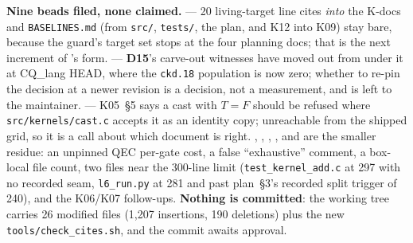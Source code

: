 \textbf{Nine beads filed, none claimed.}  --- 20 living-target line
cites \emph{into} the K-docs and \texttt{BASELINES.md} (from \texttt{src/},
\texttt{tests/}, the plan, and K12 into K09) stay bare, because the guard's
target set stops at the four planning docs; that is the next increment of
's form.  --- \textbf{D15}'s carve-out witnesses have moved
out from under it at CQ\_lang HEAD, where the \texttt{ckd.18} population is now
zero; whether to re-pin the decision at a newer revision is a decision, not a
measurement, and is left to the maintainer.  --- K05~§5 says a cast
with $T = F$ should be refused where \texttt{src/kernels/cast.c} accepts it as an
identity copy; unreachable from the shipped grid, so it is a call about which
document is right. , , , , 
and  are the smaller residue: an unpinned QEC per-gate cost, a false
``exhaustive'' comment, a box-local file count, two files near the 300-line limit
(\texttt{test\_kernel\_add.c} at 297 with no recorded seam, \texttt{l6\_run.py} at
281 and past plan~§3's recorded split trigger of 240), and the K06/K07
follow-ups. \textbf{Nothing is committed}: the working tree carries 26 modified
files (1{,}207 insertions, 190 deletions) plus the new
\texttt{tools/check\_cites.sh}, and the commit awaits approval.

